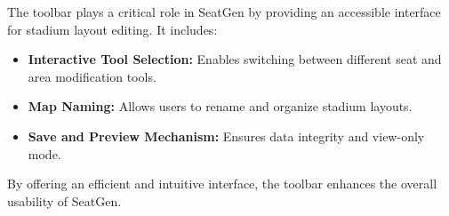 The toolbar plays a critical role in SeatGen by providing an accessible interface for stadium layout editing. It includes:
\begin{itemize}
    \item \textbf{Interactive Tool Selection:} Enables switching between different seat and area modification tools.
    \item \textbf{Map Naming:} Allows users to rename and organize stadium layouts.
    \item \textbf{Save and Preview Mechanism:} Ensures data integrity and view-only mode.
\end{itemize}

By offering an efficient and intuitive interface, the toolbar enhances the overall usability of SeatGen.
